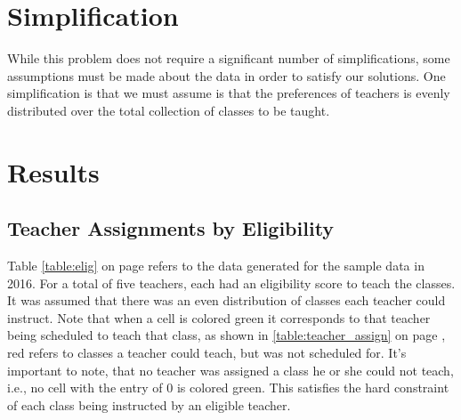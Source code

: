 \documentclass[11pt]{article}
\begin{document}
\section{Simplification}
While this problem does not require a significant number of simplifications, some assumptions must be made about the data in order to satisfy our solutions. One simplification is that we must assume is that the preferences of teachers is evenly distributed over the total collection of classes to be taught.

\section{Results}
\subsection{Teacher Assignments by Eligibility}
Table \ref{table:elig} on page \pageref{table:elig} refers to the data generated for the sample data in 2016. For a total of five teachers, each had an eligibility score to teach the classes. It was assumed that there was an even distribution of classes each teacher could instruct. Note that when a cell is colored green it corresponds to that teacher being scheduled to teach that class, as shown in \ref{table:teacher_assign} on page \pageref{table:teacher_assign}, red refers to classes a teacher could teach, but was not scheduled for. It's important to note, that no teacher was assigned a class he or she could not teach, i.e., no cell with the entry of 0 is colored green. This satisfies the hard constraint of each class being instructed by an eligible teacher. 
\end{document}
